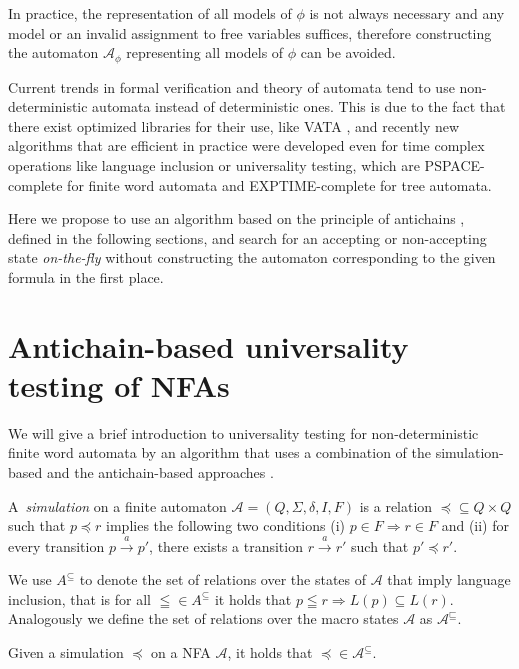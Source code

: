 In practice, the representation of all models of $\phi$ is not always necessary
and any model or an invalid assignment to free variables suffices, therefore
constructing the automaton $\mathcal{A}_{\phi}$ representing all models of
$\phi$ can be avoided.

Current trends in formal verification and theory of automata tend to use
non-deter\-ministic automata instead of deterministic ones. This is due to the
fact that there exist optimized libraries for their use, like VATA
\cite{vata}, and recently new algorithms that are efficient in practice
were developed even for time complex operations like language inclusion or
universality testing, which are PSPACE-complete for finite word automata and
EXPTIME-complete for tree automata.

Here we propose to use an algorithm based on the principle of antichains
\cite{tacas}, defined in the following sections, and search for an accepting
or non-accepting state \emph{on-the-fly} without constructing the automaton
corresponding to the given formula in the first place.

\section{Antichain-based universality testing of NFAs}

We will give a brief introduction to universality testing for non-deterministic
finite word automata by an algorithm that uses a combination
of the simulation-based and the antichain-based approaches \cite{tacas}.

\begin{defz}
A~\emph{simulation} on a finite automaton $\mathcal{A} = (Q, \Sigma, \delta, I,
F)$ is a relation $\preceq \subseteq Q \times Q$ such that $p \preceq r$ implies
the following two conditions (i) $p \in F \Rightarrow r \in F$ and (ii) for
every transition $p \overset{a}{\longrightarrow} p'$, there exists a transition $r
\overset{a}{\longrightarrow} r'$ such that $p' \preceq r'$.
\end{defz}

 We use $A^{\subseteq}$ to denote the set of relations over the states of
$\mathcal{A}$ that imply language inclusion, that is for all $\leqq \in
A^{\subseteq}$ it holds that $p \leqq r \Rightarrow L(p) \subseteq L(r)$.
Analogously we define the set of relations over the macro states $\mathcal{A}$
as $\mathcal{A}^\sqsubseteq$.

\begin{lemma}
Given a simulation $\preceq$ on a NFA $\mathcal{A}$, it holds that $\preceq \in
\mathcal{A}^\subseteq$.
\end{lemma}

